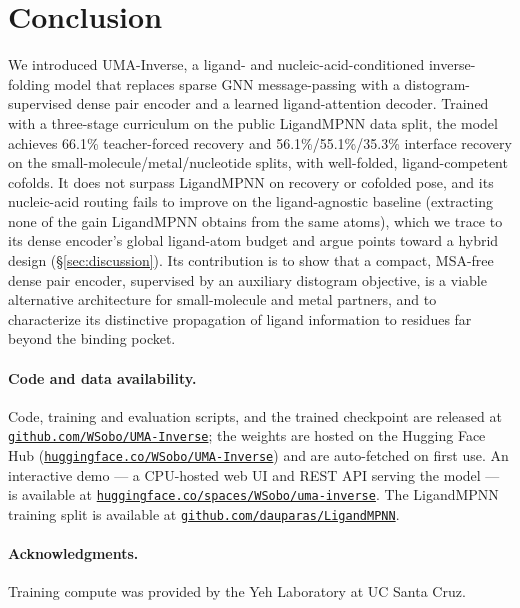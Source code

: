 \documentclass[11pt,letterpaper]{article}
\begin{document}
\section{Conclusion}

We introduced UMA-Inverse, a ligand- and nucleic-acid-conditioned inverse-folding model that replaces
sparse GNN message-passing with a distogram-supervised dense pair encoder and a learned
ligand-attention decoder. Trained with a three-stage curriculum on the public LigandMPNN data split, the model
achieves 66.1\% teacher-forced recovery and 56.1\%/55.1\%/35.3\%
interface recovery on the small-molecule/metal/nucleotide splits, with well-folded,
ligand-competent cofolds. It does not surpass LigandMPNN on recovery or cofolded pose, and its
nucleic-acid routing fails to improve on the ligand-agnostic baseline (extracting none of the gain LigandMPNN obtains from the same atoms), which we trace to its
dense encoder's global ligand-atom budget and argue points toward a hybrid design (\S\ref{sec:discussion}).
Its contribution is to show that a compact, MSA-free dense pair encoder, supervised by an auxiliary
distogram objective, is a viable alternative architecture for small-molecule and
metal partners, and to characterize its distinctive propagation of ligand information to residues far
beyond the binding pocket.

\paragraph{Code and data availability.}
Code, training and evaluation scripts, and the trained checkpoint are released at
\href{https://github.com/WSobo/UMA-Inverse}{\texttt{github.com/WSobo/UMA-Inverse}}; the weights are
hosted on the Hugging Face Hub
(\href{https://huggingface.co/WSobo/UMA-Inverse}{\texttt{huggingface.co/WSobo/UMA-Inverse}}) and are
auto-fetched on first use. An interactive demo --- a CPU-hosted web UI and REST API serving the model
--- is available at
\href{https://huggingface.co/spaces/WSobo/uma-inverse}{\texttt{huggingface.co/spaces/WSobo/uma-inverse}}.
The LigandMPNN training split is available at
\href{https://github.com/dauparas/LigandMPNN}{\texttt{github.com/dauparas/LigandMPNN}}.

\paragraph{Acknowledgments.}
Training compute was provided by the Yeh Laboratory at UC Santa Cruz.
\end{document}

